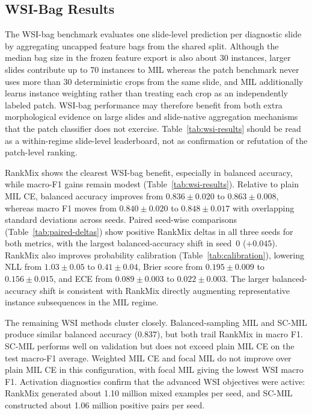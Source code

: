 \documentclass[11pt]{article}
\begin{document}
\subsection{WSI-Bag Results}
\begin{table}[ht]
  \centering
  \caption{WSI-bag test results over three seeds. Methods share the same full feature bags, attention-MIL backbone family, and evaluation code.}
  \label{tab:wsi-results}
  \small
  
\end{table}

The WSI-bag benchmark evaluates one slide-level prediction per diagnostic slide by aggregating uncapped feature bags from the shared split. Although the median bag size in the frozen feature export is also about 30 instances, larger slides contribute up to 70 instances to MIL whereas the patch benchmark never uses more than 30 deterministic crops from the same slide, and MIL additionally learns instance weighting rather than treating each crop as an independently labeled patch. WSI-bag performance may therefore benefit from both extra morphological evidence on large slides and slide-native aggregation mechanisms that the patch classifier does not exercise. Table~\ref{tab:wsi-results} should be read as a within-regime slide-level leaderboard, not as confirmation or refutation of the patch-level ranking.

RankMix shows the clearest WSI-bag benefit, especially in balanced accuracy, while macro-F1 gains remain modest (Table~\ref{tab:wsi-results}). Relative to plain MIL CE, balanced accuracy improves from $0.836 \pm 0.020$ to $0.863 \pm 0.008$, whereas macro F1 moves from $0.840 \pm 0.020$ to $0.848 \pm 0.017$ with overlapping standard deviations across seeds. Paired seed-wise comparisons (Table~\ref{tab:paired-deltas}) show positive RankMix deltas in all three seeds for both metrics, with the largest balanced-accuracy shift in seed~0 ($+0.045$). RankMix also improves probability calibration (Table~\ref{tab:calibration}), lowering NLL from $1.03 \pm 0.05$ to $0.41 \pm 0.04$, Brier score from $0.195 \pm 0.009$ to $0.156 \pm 0.015$, and ECE from $0.089 \pm 0.003$ to $0.022 \pm 0.003$. The larger balanced-accuracy shift is consistent with RankMix directly augmenting representative instance subsequences in the MIL regime.

The remaining WSI methods cluster closely. Balanced-sampling MIL and SC-MIL produce similar balanced accuracy ($0.837$), but both trail RankMix in macro F1. SC-MIL performs well on validation but does not exceed plain MIL CE on the test macro-F1 average. Weighted MIL CE and focal MIL do not improve over plain MIL CE in this configuration, with focal MIL giving the lowest WSI macro F1. Activation diagnostics confirm that the advanced WSI objectives were active: RankMix generated about 1.10 million mixed examples per seed, and SC-MIL constructed about 1.06 million positive pairs per seed.
\end{document}
